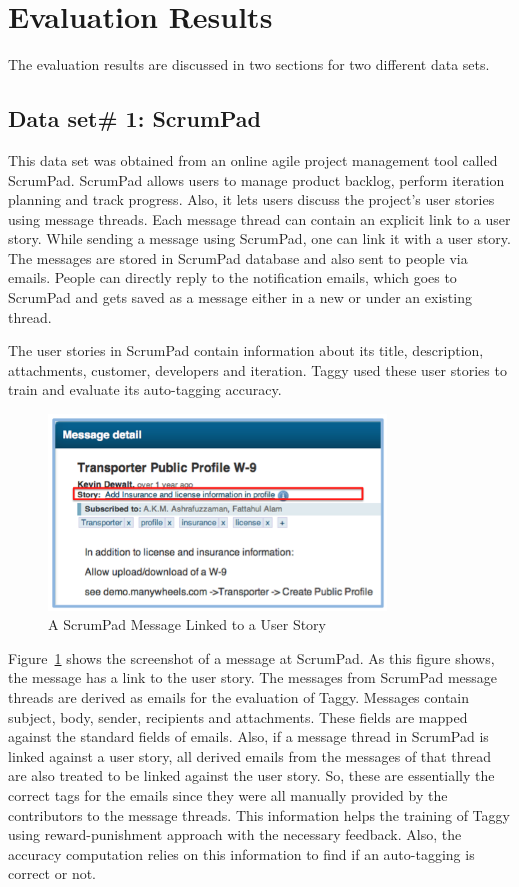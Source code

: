 \section{Evaluation Results}
The evaluation results are discussed in two sections for two different data sets.

\subsection{Data set\# 1: ScrumPad}	
This data set was obtained from an online agile project management tool called ScrumPad.	ScrumPad allows users to manage product backlog, perform iteration planning and track progress. Also, it lets users discuss the project's user stories using message threads. Each message thread can contain an explicit link to a user story. While sending a message using ScrumPad, one can link it with a user story. The messages are stored in ScrumPad database and also sent to people via emails. People can directly reply to the notification emails, which goes to ScrumPad and gets saved as a message either in a new or under an existing thread.

The user stories in ScrumPad contain information about its title, description, attachments, customer, developers and iteration. Taggy used these user stories to train and evaluate its auto-tagging accuracy.

\begin{figure}[h!]
	\centering
	\includegraphics[width=0.8\textwidth]{scrumpad_message.png}
   \caption{A ScrumPad Message Linked to a User Story}
	\label{fig:scrumpad_message}
\end{figure}

Figure~\ref{fig:scrumpad_message} shows the screenshot of a message at ScrumPad. As this figure shows, the message has a link to the user story. The messages from ScrumPad message threads are derived as emails for the evaluation of Taggy. Messages contain subject, body, sender, recipients and attachments. These fields are mapped against the standard fields of emails. Also, if a message thread in ScrumPad is linked against a user story, all derived emails from the messages of that thread are also treated to be linked against the user story. So, these are essentially the correct tags for the emails since they were all manually provided by the contributors to the message threads. This information helps the training of Taggy using reward-punishment approach with the necessary feedback. Also, the accuracy computation relies on this information to find if an auto-tagging is correct or not.

